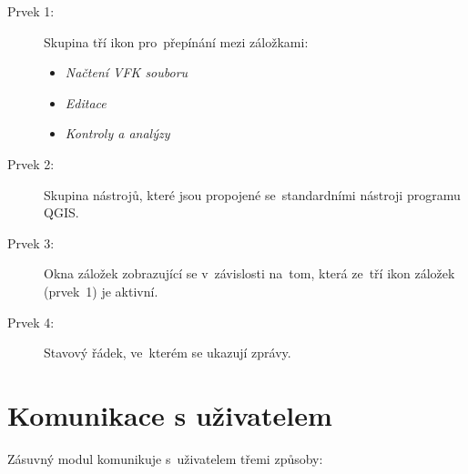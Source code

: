 \begin{description}
	\item[Prvek 1:] Skupina tří ikon pro~přepínání mezi záložkami:
	\begin{itemize}[leftmargin=1.5cm, noitemsep]
		\item {} \textit{Načtení VFK souboru}
		\item {} \textit{Editace}
		\item {} \textit{Kontroly a analýzy}
 	\end{itemize} 	
	\item[Prvek 2:] Skupina nástrojů, které jsou propojené se~standardními nástroji programu QGIS.
	\item[Prvek 3:] Okna záložek zobrazující se v~závislosti na~tom, která ze~tří ikon záložek (prvek~1) je aktivní.
	\item[Prvek 4:] Stavový řádek, ve~kterém se ukazují zprávy.
\end{description}

\newpage

\section{Komunikace s uživatelem}
\label{manual_komunikace}

Zásuvný modul komunikuje s~uživatelem třemi způsoby:

